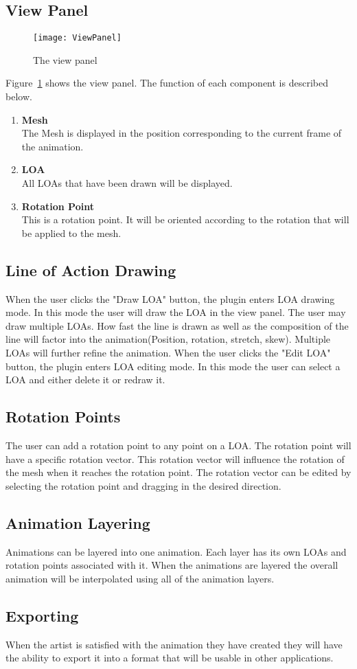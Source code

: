 \subsection{View Panel}
\begin{figure}[H]
\centering
\texttt{[image: ViewPanel]}
\caption{The view panel}
\label{fig:viewPanel}
\end{figure}
Figure~\ref{fig:viewPanel} shows the view panel.  The function of each component is described below.
\begin{enumerate}
	\item \textbf{Mesh} \hfill \\
		The Mesh is displayed in the position corresponding to the current frame of the animation.
	\item \textbf{LOA} \hfill \\
		All LOAs that have been drawn will be displayed.
	\item \textbf{Rotation Point} \hfill \\
		This is a rotation point.  It will be oriented according to the rotation that will be applied to the mesh.
\end{enumerate}
\subsection{Line of Action Drawing}
	When the user clicks the "Draw LOA" button, the plugin enters LOA drawing mode.  In this mode the user will draw the LOA in the view panel.  The user may draw multiple LOAs.  How fast the line is drawn as well as the composition of the line will factor into the animation(Position, rotation, stretch, skew).  Multiple LOAs will further refine the animation.
	When the user clicks the "Edit LOA" button, the plugin enters LOA editing mode.  In this mode the user can select a LOA and either delete it or redraw it.
\subsection{Rotation Points}
	The user can add a rotation point to any point on a LOA.  The rotation point will have a specific rotation vector.  This rotation vector will influence the rotation of the mesh when it reaches the rotation point.  The rotation vector can be edited by selecting the rotation point and dragging in the desired direction.
\subsection{Animation Layering}
	Animations can be layered into one animation.  Each layer has its own LOAs and rotation points associated with it.  When the animations are layered the overall animation will be interpolated using all of the animation layers.
\subsection{Exporting}
	When the artist is satisfied with the animation they have created they will have the ability to export it into a format that will be usable in other applications.
